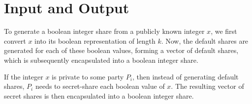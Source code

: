 \section{Input and Output}

To generate a boolean integer share from a publicly known integer $x$, we first convert $x$ into its
boolean representation of length $k$. Now, the default shares are generated for each of these boolean
values, forming a vector of default shares, which is subsequently encapsulated into a boolean integer
share.

If the integer $x$ is private to some party $P_i$, then instead of generating default shares, $P_i$
needs to secret-share each boolean value of $x$. The resulting vector of secret shares is then
encapsulated into a boolean integer share.


